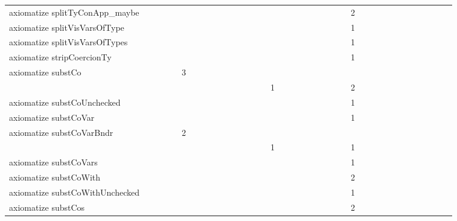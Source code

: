 {\begin{tabular}{l|rrr|rrr|rrr}
axiomatize splitTyConApp_maybe &  &  &  &  &  &  &  &  &  &  &  &  &  &  &  &  &  &  &  &  &  &  &  & 2 &  &  &  &  &  &  &  &  &  &  &  & \\
axiomatize splitVisVarsOfType &  &  &  &  &  &  &  &  &  &  &  &  &  &  &  &  &  &  &  &  &  &  &  & 1 &  &  &  &  &  &  &  &  &  &  &  & \\
axiomatize splitVisVarsOfTypes &  &  &  &  &  &  &  &  &  &  &  &  &  &  &  &  &  &  &  &  &  &  &  & 1 &  &  &  &  &  &  &  &  &  &  &  & \\
axiomatize stripCoercionTy &  &  &  &  &  &  &  &  &  &  &  &  &  &  &  &  &  &  &  &  &  &  &  & 1 &  &  &  &  &  &  &  &  &  &  &  & \\
axiomatize substCo &  &  &  &  & 3 &  &  &  & \\
\quad  &  &  &  &  &  &  &  &  &  &  &  &  &  &  & 1 &  &  &  &  &  &  &  &  & 2 &  &  &  &  &  &  &  &  &  &  &  & \\
axiomatize substCoUnchecked &  &  &  &  &  &  &  &  &  &  &  &  &  &  &  &  &  &  &  &  &  &  &  & 1 &  &  &  &  &  &  &  &  &  &  &  & \\
axiomatize substCoVar &  &  &  &  &  &  &  &  &  &  &  &  &  &  &  &  &  &  &  &  &  &  &  & 1 &  &  &  &  &  &  &  &  &  &  &  & \\
axiomatize substCoVarBndr &  &  &  &  & 2 &  &  &  & \\
\quad  &  &  &  &  &  &  &  &  &  &  &  &  &  &  & 1 &  &  &  &  &  &  &  &  & 1 &  &  &  &  &  &  &  &  &  &  &  & \\
axiomatize substCoVars &  &  &  &  &  &  &  &  &  &  &  &  &  &  &  &  &  &  &  &  &  &  &  & 1 &  &  &  &  &  &  &  &  &  &  &  & \\
axiomatize substCoWith &  &  &  &  &  &  &  &  &  &  &  &  &  &  &  &  &  &  &  &  &  &  &  & 2 &  &  &  &  &  &  &  &  &  &  &  & \\
axiomatize substCoWithUnchecked &  &  &  &  &  &  &  &  &  &  &  &  &  &  &  &  &  &  &  &  &  &  &  & 1 &  &  &  &  &  &  &  &  &  &  &  & \\
axiomatize substCos &  &  &  &  &  &  &  &  &  &  &  &  &  &  &  &  &  &  &  &  &  &  &  & 2 &  &  &  &  &  &  &  &  &  &  &  & \\

\end{tabular}}
